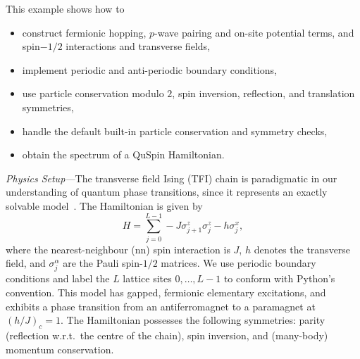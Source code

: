 \documentclass{SciPost}
\newcommand\0{\scalebox{-1}[1]{0}}
\begin{document}
This example shows how to
\begin{itemize}
	\item construct fermionic hopping, $p$-wave pairing and on-site potential terms, and spin$-1/2$ interactions and transverse fields,
	\item implement periodic and anti-periodic boundary conditions,
	\item use particle conservation modulo $2$, spin inversion, reflection, and translation symmetries,
	\item handle the default built-in particle conservation and symmetry checks,
	\item obtain the spectrum of a QuSpin Hamiltonian.
\end{itemize}

\noindent\emph{Physics Setup---}The transverse field Ising (TFI) chain is paradigmatic in our understanding of quantum phase transitions, since it represents an exactly solvable model~\cite{sachdev_book}. The Hamiltonian is given by
\begin{equation}
H=\sum_{j=0}^{L-1}-J\sigma^z_{j+1}\sigma^z_j - h\sigma^x_j,
\label{eq:TFIM}
\end{equation} 
where the nearest-neighbour (nn) spin interaction is $J$, $h$ denotes the transverse field, and $\sigma^\alpha_j$ are the Pauli spin-$1/2$ matrices. We use periodic boundary conditions and label the $L$ lattice sites $0,\dots,L-1$ to conform with Python's convention. This model has gapped, fermionic elementary excitations, and exhibits a phase transition from an antiferromagnet to a paramagnet at $\left(h/J\right)_c=1$. The Hamiltonian possesses the following symmetries: parity (reflection w.r.t.~the centre of the chain), spin inversion, and (many-body) momentum conservation.
\end{document}

